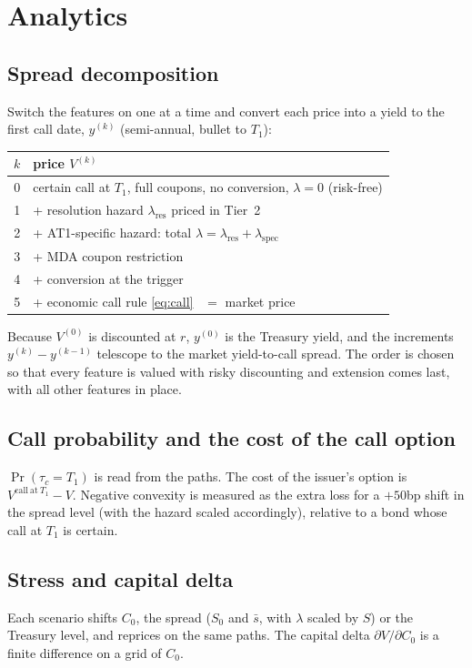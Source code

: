 \documentclass[11pt]{article}
\newcommand{\1}{\mathbf{1}}
\begin{document}
\section{Analytics}

\subsection{Spread decomposition}
Switch the features on one at a time and convert each price into a yield to the
first call date, $y^{(k)}$ (semi-annual, bullet to $T_1$):
\begin{center}
\begin{tabular}{cl}
\toprule
$k$ & price $V^{(k)}$ \\
\midrule
0 & certain call at $T_1$, full coupons, no conversion, $\lambda=0$ (risk-free) \\
1 & + resolution hazard $\lambda_{\mathrm{res}}$ priced in Tier~2 \\
2 & + AT1-specific hazard: total $\lambda=\lambda_{\mathrm{res}}+\lambda_{\mathrm{spec}}$ \\
3 & + MDA coupon restriction \\
4 & + conversion at the trigger \\
5 & + economic call rule \eqref{eq:call} \ $=$ market price \\
\bottomrule
\end{tabular}
\end{center}
Because $V^{(0)}$ is discounted at $r$, $y^{(0)}$ is the Treasury yield, and the
increments $y^{(k)}-y^{(k-1)}$ telescope to the market yield-to-call spread. The
order is chosen so that every feature is valued with risky discounting and
extension comes last, with all other features in place.

\subsection{Call probability and the cost of the call option}
$\Pr(\tau_c=T_1)$ is read from the paths. The cost of the issuer's option is
$V^{\mathrm{call\ at\ }T_1}-V$. Negative convexity is measured as the extra loss
for a $+50$bp shift in the spread level (with the hazard scaled accordingly),
relative to a bond whose call at $T_1$ is certain.

\subsection{Stress and capital delta}
Each scenario shifts $C_0$, the spread ($S_0$ and $\bar s$, with $\lambda$ scaled
by $S$) or the Treasury level, and reprices on the same paths. The capital delta
$\partial V/\partial C_0$ is a finite difference on a grid of $C_0$.
\end{document}
